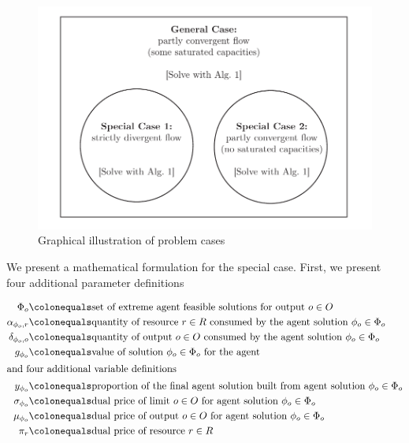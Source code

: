 \begin{figure}[h]
  \centering
  \includegraphics[width=\textwidth]{images/cases}
  \caption{Graphical illustration of problem cases}
  \label{fig:cases}
\end{figure}

We present a mathematical formulation for the special case. First, we present four additional parameter definitions

\begin{align*}
\Phi_o &\colonequals  \text{set of extreme agent feasible solutions for output $o \in O$}\\
\alpha_{\phi_o,r} &\colonequals \text{quantity of resource $r \in R$ consumed by the agent solution $\phi_o \in \Phi_o$}\\
\delta_{\phi_o,o} &\colonequals \text{quantity of output $o \in O$ consumed by the agent solution $\phi_o \in \Phi_o$}\\
g_{\phi_o} &\colonequals \text{value of solution $\phi_o \in \Phi_o$ for the agent}\\
\intertext{and four additional variable definitions}
y_{\phi_o} &\colonequals \text{proportion of the final agent solution built from agent solution $\phi_o \in \Phi_o$}\\
\sigma_{\phi_o} &\colonequals \text{dual price of limit $o \in O$ for agent solution $\phi_o \in \Phi_o$} \\
\mu_{\phi_o} &\colonequals \text{dual price of output $o \in O$ for agent solution $\phi_o \in \Phi_o$}\\
\pi_r &\colonequals \text{dual price of resource $r \in R$}\\
\end{align*}

